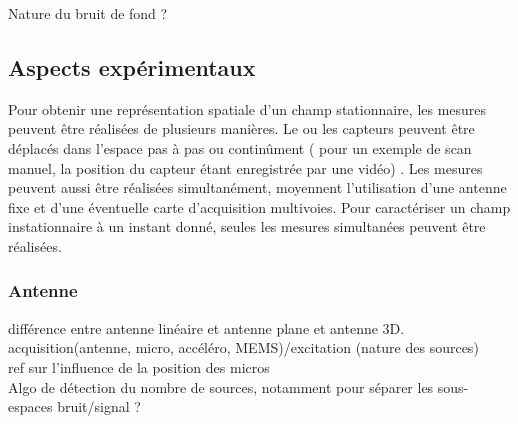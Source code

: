 Nature du bruit de fond ?


\subsection{Aspects expérimentaux}
Pour obtenir une représentation spatiale d'un champ stationnaire, les mesures peuvent être réalisées de plusieurs manières. Le ou les capteurs peuvent être déplacés dans l'espace pas à pas ou continûment (\cite{Comesana2013} pour un exemple de scan manuel, la position du capteur étant enregistrée par une vidéo) . Les mesures peuvent aussi être réalisées simultanément, moyennent l'utilisation d'une antenne fixe et d'une éventuelle carte d'acquisition multivoies. Pour caractériser un champ instationnaire à un instant donné, seules les mesures simultanées peuvent être réalisées.

\subsubsection{Antenne}
différence entre antenne linéaire et antenne plane et antenne 3D.\\

acquisition(antenne, micro, accéléro, MEMS)/excitation (nature des sources)\\

ref sur l'influence de la position des micros\\



Algo de détection du nombre de sources, notamment pour séparer les sous-espaces bruit/signal ?

